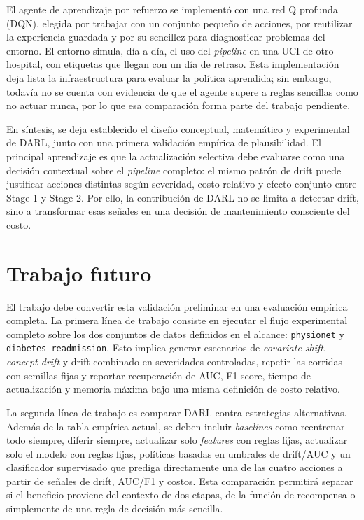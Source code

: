 El agente de aprendizaje por refuerzo se implementó con una red Q profunda (DQN),
elegida por trabajar con un conjunto pequeño de acciones, por reutilizar la
experiencia guardada y por su sencillez para diagnosticar problemas del entorno.
El entorno simula, día a día, el uso del \textit{pipeline} en una UCI de otro
hospital, con etiquetas que llegan con un día de retraso. Esta implementación
deja lista la infraestructura para evaluar la política aprendida; sin embargo,
todavía no se cuenta con evidencia de que el agente supere a reglas sencillas
como no actuar nunca, por lo que esa comparación forma parte del trabajo
pendiente.

En síntesis, se deja establecido el diseño conceptual, matemático y
experimental de DARL, junto con una primera validación empírica de plausibilidad.
El principal aprendizaje es que la actualización selectiva debe evaluarse como
una decisión contextual sobre el \textit{pipeline} completo: el mismo patrón de
drift puede justificar acciones distintas según severidad, costo relativo y
efecto conjunto entre Stage 1 y Stage 2. Por ello, la contribución de DARL no se
limita a detectar drift, sino a transformar esas señales en una decisión de
mantenimiento consciente del costo.

\section*{Trabajo futuro}

El trabajo debe convertir esta validación preliminar en una evaluación
empírica completa. La primera línea de trabajo consiste en ejecutar el flujo
experimental completo sobre los dos conjuntos de datos definidos en el alcance:
\texttt{physionet} y \texttt{diabetes\_readmission}. Esto implica generar
escenarios de \textit{covariate shift}, \textit{concept drift} y drift combinado
en severidades controladas, repetir las corridas con semillas fijas y reportar
recuperación de AUC, F1-score, tiempo de actualización y memoria máxima bajo una
misma definición de costo relativo.

La segunda línea de trabajo es comparar DARL contra estrategias alternativas.
Además de la tabla empírica actual, se deben incluir \textit{baselines} como
reentrenar todo siempre, diferir siempre, actualizar solo \textit{features} con
reglas fijas, actualizar solo el modelo con reglas fijas, políticas basadas en
umbrales de drift/AUC y un clasificador supervisado que prediga directamente una
de las cuatro acciones a partir de señales de drift, AUC/F1 y costos. Esta
comparación permitirá separar si el beneficio proviene del contexto de dos
etapas, de la función de recompensa o simplemente de una regla de decisión más
sencilla.

